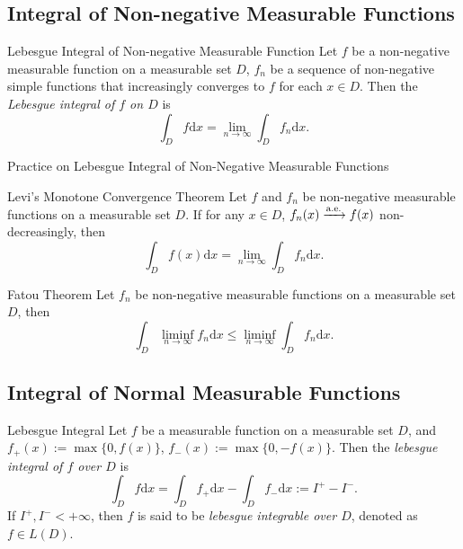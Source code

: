 \subsection{Integral of Non-negative Measurable Functions}

\begin{definition}{Lebesgue Integral of Non-negative Measurable Function}{}
  Let $f$ be a non-negative measurable function on a measurable set $D$,
  $f_n$ be a sequence of non-negative simple functions that increasingly
  converges to $f$ for each $x \in D$.
  Then the \emph{Lebesgue integral of $f$ on $D$} is
  \begin{equation}
    \int_D f \mathrm{d} x= \lim \limits _{n \rightarrow \infty} \int_D f_n \mathrm{d} x.
  \end{equation}
\end{definition}

\begin{example}{Practice on Lebesgue Integral of Non-Negative Measurable Functions}{}
\end{example}


\begin{theorem}{Levi's Monotone Convergence Theorem}{}
  Let $f$ and $f_n$ be non-negative measurable functions on a measurable set
  $D$.
  If for any $x \in D$, $f_n(x) \xrightarrow{\text{a.e.}} f(x)$ non-decreasingly, then
  \begin{equation}
    \int_D f(x)\mathrm{d} x = \lim \limits _{n \rightarrow \infty} \int_D f_n\mathrm{d} x.
  \end{equation}
\end{theorem}

\begin{theorem}{Fatou Theorem}{}
  Let $f_n$ be non-negative measurable functions on a measurable set $D$,
  then
  \begin{equation}
    \int_D \liminf \limits_{n \rightarrow \infty} f_n\mathrm{d} x
    \leq \liminf \limits_{n \rightarrow \infty} \int_D f_n\mathrm{d} x.
  \end{equation}
\end{theorem}

\subsection{Integral of Normal Measurable Functions}

\begin{definition}{Lebesgue Integral}{}
  Let $f$ be a measurable function on a measurable set $D$,
  and $f_+(x) := \max\{0, f(x)\}$, $f_-(x) := \max\{0, -f(x)\}$.
  Then the \emph{lebesgue integral of $f$ over $D$} is
  \begin{equation}
    \int_D f \mathrm{d} x 
    = \int_D f_+ \mathrm{d} x - \int_D f_-\mathrm{d} x
    := I^+ - I^-.
  \end{equation}
  If $I^+, I^- < +\infty$, then $f$ is said to be \emph{lebesgue integrable over
    $D$}, denoted as $f \in L(D)$.
\end{definition}

